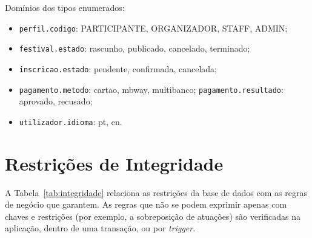 \noindent Domínios dos tipos enumerados:
\begin{itemize}\small
  \item \texttt{perfil.codigo}: PARTICIPANTE, ORGANIZADOR, STAFF, ADMIN;
  \item \texttt{festival.estado}: rascunho, publicado, cancelado, terminado;
  \item \texttt{inscricao.estado}: pendente, confirmada, cancelada;
  \item \texttt{pagamento.metodo}: cartao, mbway, multibanco;
        \texttt{pagamento.resultado}: aprovado, recusado;
  \item \texttt{utilizador.idioma}: pt, en.
\end{itemize}

\section{Restrições de Integridade}

A Tabela~\ref{tab:integridade} relaciona as restrições da base de dados com
as regras de negócio que garantem. As regras que não se podem exprimir apenas
com chaves e restrições (por exemplo, a sobreposição de atuações) são
verificadas na aplicação, dentro de uma transação, ou por \emph{trigger}.

